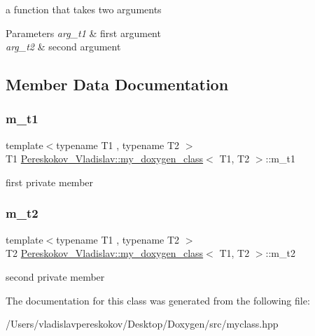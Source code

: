 a function that takes two arguments 


\begin{DoxyParams}{Parameters}
{\em arg\+\_\+t1} & first argument \\
\hline
{\em arg\+\_\+t2} & second argument \\
\hline
\end{DoxyParams}


\subsection{Member Data Documentation}
\mbox{\label{classPereskokov__Vladislav_1_1my__doxygen__class_a0f7259804082c8a55fe0c9cbf2835fa9}} 
\subsubsection{\texorpdfstring{m\+\_\+t1}{m\_t1}}
{\footnotesize\ttfamily template$<$typename T1 , typename T2 $>$ \\
T1 \hyperlink{classPereskokov__Vladislav_1_1my__doxygen__class}{Pereskokov\+\_\+\+Vladislav\+::my\+\_\+doxygen\+\_\+class}$<$ T1, T2 $>$\+::m\+\_\+t1\hspace{0.3cm}{\ttfamily [private]}}

first private member \mbox{\label{classPereskokov__Vladislav_1_1my__doxygen__class_a54ac784b0f4d5976c4879e024166bf04}} 
\subsubsection{\texorpdfstring{m\+\_\+t2}{m\_t2}}
{\footnotesize\ttfamily template$<$typename T1 , typename T2 $>$ \\
T2 \hyperlink{classPereskokov__Vladislav_1_1my__doxygen__class}{Pereskokov\+\_\+\+Vladislav\+::my\+\_\+doxygen\+\_\+class}$<$ T1, T2 $>$\+::m\+\_\+t2\hspace{0.3cm}{\ttfamily [private]}}

second private member 

The documentation for this class was generated from the following file\+:\begin{DoxyCompactItemize}
\item 
/\+Users/vladislavpereskokov/\+Desktop/\+Doxygen/src/myclass.\+hpp\end{DoxyCompactItemize}
